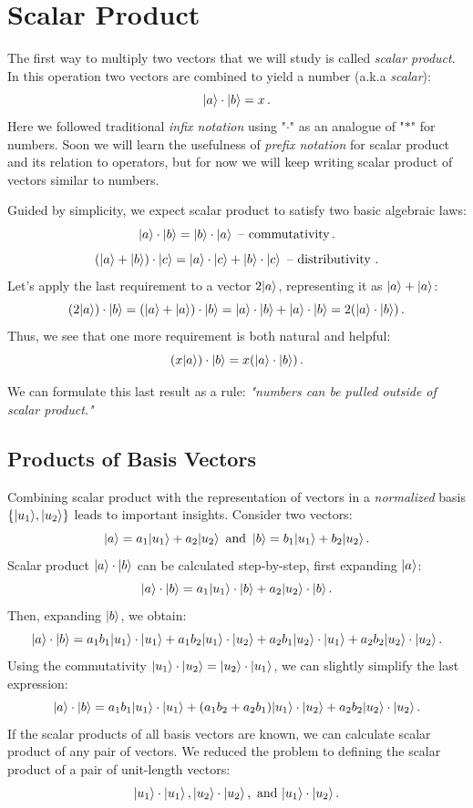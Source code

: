 \section{Scalar Product}
The first way to multiply two vectors that we will study is called \emph{scalar product}. In this operation two vectors are combined to yield a number (a.k.a \emph{scalar}):
\[
|{a}\rangle\cdot|{b}\rangle = x\,.
\]
Here we followed traditional \emph{infix notation} using "$\cdot$" as an analogue of "$*$" for numbers. Soon we will learn the usefulness of \emph{prefix notation} for scalar product and its relation to operators, but for now we will keep writing scalar product of vectors similar to numbers.

Guided by simplicity, we expect scalar product to satisfy two basic algebraic laws:
\[
|{a}\rangle\cdot|{b}\rangle  = |{b}\rangle\cdot|{a}\rangle\,\textrm{  -- commutativity}\,. 
\]
\[
(|{a}\rangle+|{b}\rangle)\cdot|{c}\rangle=|{a}\rangle\cdot|{c}\rangle+|{b}\rangle\cdot|{c}\rangle\,\textrm{ -- distributivity }.
\]
Let's apply the last requirement to a vector $2|{a}\rangle$, representing it as $|{a}\rangle+|{a}\rangle$:
\[
(2|{a}\rangle)\cdot|{b}\rangle=(|{a}\rangle+|{a}\rangle)\cdot|{b}\rangle=|{a}\rangle\cdot|{b}\rangle+|{a}\rangle\cdot|{b}\rangle=2(|{a}\rangle\cdot|{b}\rangle)\,.
\]
Thus, we see that one more requirement is both natural and helpful:
\[
(x|{a}\rangle)\cdot|{b}\rangle=x(|{a}\rangle\cdot|{b}\rangle)\,.
\]
\begin{remark}
	We can formulate this last result as a rule: \emph{"numbers can be pulled outside of scalar product."}
\end{remark}


\subsection{Products of Basis Vectors}
Combining scalar product with the representation of vectors in a \emph{normalized} basis $\lbrace 
|{u_1}\rangle, |{u_2}\rangle\rbrace$ leads to important insights. Consider two vectors:
\[
|{a}\rangle=a_1|{u_1}\rangle+a_2|{u_2}\rangle\,\textrm{ and }\,|{b}\rangle=b_1|{u_1}\rangle+b_2|{u_2}\rangle\,.
\]
Scalar product $|{a}\rangle\cdot|{b}\rangle$ can be calculated step-by-step, first expanding $|{a}\rangle$:
\[
|{a}\rangle\cdot|{b}\rangle = a_1|{u_1}\rangle\cdot|{b}\rangle+a_2|{u_2}\rangle\cdot|{b}\rangle\,.
\]
Then, expanding $|{b}\rangle$, we obtain:
\[
|{a}\rangle\cdot|{b}\rangle=a_1b_1|{u_1}\rangle\cdot|{u_1}\rangle+a_1b_2|{u_1}\rangle\cdot|{u_2}\rangle+a_2b_1|{u_2}\rangle\cdot|{u_1}\rangle+a_2b_2|{u_2}\rangle\cdot|{u_2}\rangle\,.
\]
Using the commutativity $|{u_1}\rangle\cdot|{u_2}\rangle=|{u_2}\rangle\cdot|{u_1}\rangle$, we can slightly simplify the last expression:
\[
|{a}\rangle\cdot|{b}\rangle=a_1b_1|{u_1}\rangle\cdot|{u_1}\rangle+(a_1b_2+a_2b_1)|{u_1}\rangle\cdot|{u_2}\rangle+a_2b_2|{u_2}\rangle\cdot|{u_2}\rangle\,.
\]
If the scalar products of all basis vectors are known, we can calculate scalar product of any pair of vectors. We reduced the problem to defining the scalar product of a pair of unit-length vectors:
\[
|{u_1}\rangle\cdot|{u_1}\rangle\,,|{u_2}\rangle\cdot|{u_2}\rangle\,,\textrm{ and }|{u_1}\rangle\cdot|{u_2}\rangle\,.
\]

